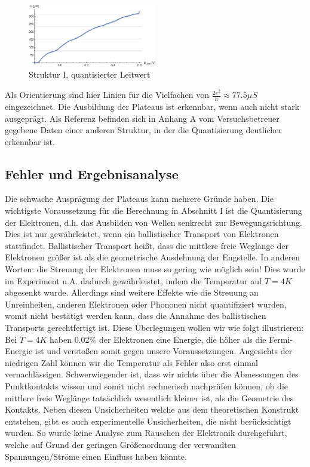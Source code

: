 \documentclass[aps,twocolumn,secnumarabic,nobalancelastpage,amsmath,amssymb,
nofootinbib,superscriptaddress]{revtex4-1}
\begin{document}
\begin{figure}[h]
  \centering
  \includegraphics[width=0.5\textwidth]{Berechnung-Bilder/j.eps}
  \caption{Struktur I, quantisierter Leitwert}
  \label{fig:I}
\end{figure}

Als Orientierung sind hier Linien für die Vielfachen von $\frac{2e^2}{h} \approx 77.5 \mu S$
eingezeichnet. Die Ausbildung der Plateaus ist erkennbar, wenn auch nicht stark
ausgeprägt. Als Referenz befinden sich in Anhang A vom Versuchsbetreuer gegebene
Daten einer anderen Struktur, in der die Quantisierung deutlicher erkennbar ist.


\subsection{Fehler und Ergebnisanalyse}
Die schwache Ausprägung der Plateaus kann mehrere Gründe haben. Die wichtigste
Voraussetzung für die Berechnung in Abschnitt I ist die Quantisierung der Elektronen,
d.h. das Ausbilden von Wellen senkrecht zur Bewegungsrichtung. Dies ist nur
gewährleistet, wenn ein ballistischer Transport von Elektronen
stattfindet. Ballistischer Transport heißt, dass die mittlere freie Weglänge der
Elektronen größer ist als die geometrische Ausdehnung der Engstelle. In anderen
Worten: die Streuung der Elektronen muss so gering wie möglich sein! Dies wurde
im Experiment u.A. dadurch gewährleistet, indem die Temperatur auf $T=4K$ abgesenkt
wurde. Allerdings sind weitere Effekte wie die Streuung an Unreinheiten, anderen
Elektronen oder Phononen nicht quantifiziert wurden, womit nicht bestätigt
werden kann, dass die Annahme des ballistischen Transports gerechtfertigt ist.
Diese Überlegungen wollen wir wie folgt illustrieren:
Bei $T=4K$ haben 0.02\% der Elektronen eine Energie, die höher als die
Fermi-Energie ist und verstoßen somit gegen unsere Voraussetzungen. Angesichts der
niedrigen Zahl können wir die Temperatur als Fehler also erst einmal vernachlässigen.
Schwerwiegender ist, dass wir nichts über die Abmessungen des Punktkontakts wissen
und somit nicht rechnerisch nachprüfen können, ob die mittlere freie Weglänge
tatsächlich wesentlich kleiner ist, als die Geometrie des Kontakts.
Neben diesen Unsicherheiten welche aus dem theoretischen Konstrukt entstehen, gibt
es auch experimentelle Unsicherheiten, die nicht berücksichtigt wurden. So wurde
keine Analyse zum Rauschen der Elektronik durchgeführt, welche auf Grund der geringen
Größenordnung der verwandten Spannungen/Ströme einen Einfluss haben könnte.
\end{document}
